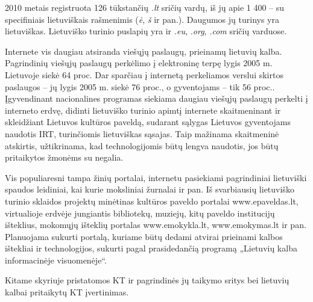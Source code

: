 \documentclass[]{../metanetpaper}
\begin{document}
\begin{multicols}{2}

2010 metais registruota 126 tūkstančių \textit{.lt} sričių vardų, iš jų apie 1 400 –  su specifiniais lietuviškais rašmenimis (\textit{ė}, \textit{š} ir pan.). Daugumos jų turinys yra lietuviškas. Lietuviško turinio puslapių yra ir \textit{.eu}, \textit{.org}, \textit{.com} sričių varduose.   


 Internete vis daugiau atsiranda viešųjų paslaugų, prieinamų lietuvių kalba. Pagrindinių viešųjų paslaugų perkėlimo į elektroninę terpę lygis 2005 m. Lietuvoje siekė 64 proc. Dar sparčiau į internetą perkeliamos verslui skirtos paslaugos – jų lygis 2005 m. siekė 76 proc., o gyventojams – tik 56 proc.\cite{esparama}.  Įgyvendinant nacionalines programas siekiama daugiau viešųjų paslaugų perkelti į interneto erdvę, didinti lietuviško turinio apimtį internete skaitmeninant ir skleidžiant Lietuvos kultūros paveldą, sudarant sąlygas Lietuvos gyventojams naudotis IRT, turinčiomis lietuviškas sąsajas. Taip mažinama skaitmeninė atskirtis, užtikrinama, kad technologijomis būtų lengva naudotis, jos būtų pritaikytos žmonėms su negalia.   

   Vis populiaresni tampa žinių portalai, internetu pasiekiami pagrindiniai lietuviški spaudos leidiniai, kai kurie moksliniai žurnalai ir pan. Iš svarbiausių lietuviško turinio sklaidos projektų minėtinas kultūros paveldo portalai www.epaveldas.lt, virtualioje erdvėje jungiantis bibliotekų, muziejų, kitų paveldo institucijų išteklius, mokomųjų išteklių portalas www.emokykla.lt, www.emokymas.lt ir pan. Planuojama sukurti portalą, kuriame būtų dedami atvirai prieinami kalbos ištekliai ir technologijos, sukurti pagal prasidedančią programą „Lietuvių kalba informacinėje visuomenėje“.  

Kitame skyriuje pristatomos KT ir pagrindinės jų taikymo sritys bei lietuvių kalbai pritaikytų KT įvertinimas.

\end{multicols}

\clearpage

\end{document}
